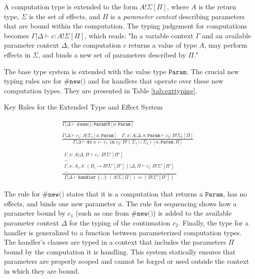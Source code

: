 \documentclass{article}
\begin{document}
A computation type is extended to the form $A!\Sigma[\Pi]$, where $A$ is the return type, $\Sigma$ is the set of effects, and $\Pi$ is a \emph{parameter context} describing parameters that are bound within the computation. The typing judgement for computations becomes $\Gamma | \Delta \vdash c : A!\Sigma[\Pi]$, which reads: "In a variable context $\Gamma$ and an available parameter context $\Delta$, the computation $c$ returns a value of type $A$, may perform effects in $\Sigma$, and binds a new set of parameters described by $\Pi$."

The base type system is extended with the value type $\texttt{Param}$. The crucial new typing rules are for $\texttt{\#new()}$ and for handlers that operate over these new computation types. They are presented in Table \ref{tab:exttyping}.

\begin{table}[h!]
\centering
\caption{Key Rules for the Extended Type and Effect System}
\label{tab:exttyping}
\begin{gather*}
\frac{}{\Gamma | \Delta \vdash \texttt{\#new()} : \texttt{Param}!\emptyset[a:\texttt{Param}]}
\\ \\
\frac{\Gamma | \Delta \vdash c_1 : A!\Sigma_1[a:\texttt{Param}] \quad \Gamma, x:A | \Delta, a:\texttt{Param} \vdash c_2 : B!\Sigma_2[\Pi]}{\Gamma | \Delta \vdash \texttt{do } x \leftarrow c_1 \texttt{ in } c_2 : B!(\Sigma_1 \cup \Sigma_2)[a:\texttt{Param}, \Pi]}
\\ \\
\frac{
\begin{array}{c}
\Gamma, x:A | \Delta, \Pi \vdash c_{r} : B!\Sigma'[\Pi'] \\
\dots \\
\Gamma, x:A_i, k: (B_i \rightarrow B!\Sigma'[\Pi']) | \Delta, \Pi \vdash c_i : B!\Sigma'[\Pi'] \\
\dots
\end{array}
}
{\Gamma | \Delta \vdash \texttt{handler } \{\dots\}: (A!\Sigma[\Pi]) \Rightarrow (B!\Sigma'[\Pi'])}
\end{gather*}
\end{table}

The rule for $\texttt{\#new()}$ states that it is a computation that returns a $\texttt{Param}$, has no effects, and binds one new parameter $a$. The rule for sequencing shows how a parameter bound by $c_1$ (such as one from $\texttt{\#new()}$) is added to the available parameter context $\Delta$ for the typing of the continuation $c_2$. Finally, the type for a handler is generalized to a function between parameterized computation types. The handler's clauses are typed in a context that includes the parameters $\Pi$ bound by the computation it is handling. This system statically ensures that parameters are properly scoped and cannot be forged or used outside the context in which they are bound.
\end{document}
